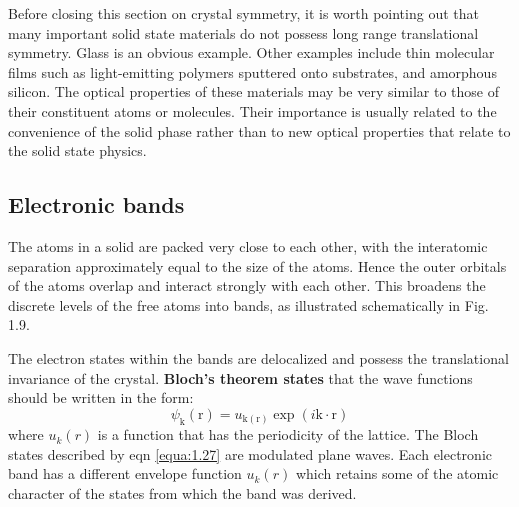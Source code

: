 \documentclass[12pt]{book}
\begin{document}
Before closing this section on crystal symmetry, it is worth pointing out that many important solid state materials do not possess long range translational symmetry. Glass is an obvious example. Other examples include thin molecular films such as light-emitting polymers sputtered onto substrates, and amorphous silicon. 
The optical properties of these materials may be very similar to those of their constituent atoms or molecules. Their importance is usually related to the convenience of the solid phase rather than to new optical properties that relate to the solid state physics.

\subsection{Electronic bands}



The atoms in a solid are packed very close to each other, with the interatomic separation approximately equal to the size of the atoms. Hence the outer orbitals of the atoms overlap and interact strongly with each other. This broadens the discrete levels of the free atoms into bands, as illustrated schematically in Fig. 1.9.

The electron states within the bands are delocalized and possess the translational invariance of the crystal. \textbf{Bloch's theorem states} that the wave functions should be written in the form:
\begin{equation}\label{equa:1.27}
  \psi_{\mathrm{k}}(\mathrm{r})=u_{\mathrm{k}(\mathrm{r})}\exp(i\mathrm{k}\cdot \mathrm{r})
\end{equation}
where $u_k(r)$ is a function that has the periodicity of the lattice. The Bloch states described by eqn \ref{equa:1.27} are modulated plane waves. Each electronic band has a different envelope function $u_k (r)$ which retains some of the atomic character of the states from which the band was derived.
\end{document}
